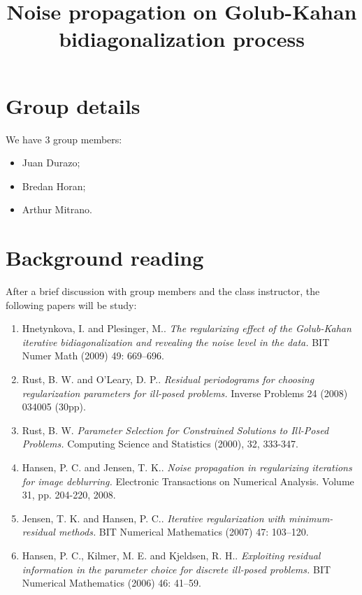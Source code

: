 \documentclass{article}
\begin{document}
\title{Noise propagation on Golub-Kahan bidiagonalization process}

\maketitle

\section{Group details}
We have 3 group members:
\begin{itemize}
	\item Juan Durazo;
	\item Bredan Horan;
	\item Arthur Mitrano.
\end{itemize}

\section{Background reading}
After a brief discussion with group members and the class instructor, the following papers will be study:

\begin{enumerate}
	\item Hnetynkova, I. and Plesinger, M..
		\emph{The regularizing effect of the Golub-Kahan iterative bidiagonalization and revealing the noise level in the data.}
		BIT Numer Math (2009) 49: 669–696.
	\item Rust, B. W. and O'Leary, D. P.. 
		\emph{Residual periodograms for choosing regularization parameters for ill-posed problems.}
		Inverse Problems 24 (2008) 034005 (30pp).
	\item Rust, B. W. 
		\emph{Parameter Selection for Constrained Solutions to Ill-Posed Problems.}
		Computing Science and Statistics (2000), 32, 333-347.
	\item  Hansen, P. C. and Jensen, T. K..
		\emph{Noise propagation in regularizing iterations for image deblurring.}
		Electronic Transactions on Numerical Analysis. Volume 31, pp. 204-220, 2008.
	\item Jensen, T. K. and Hansen, P. C..
		\emph{Iterative regularization with minimum-residual methods.}
		BIT Numerical Mathematics (2007) 47: 103–120.
	\item Hansen, P. C., Kilmer, M. E. and Kjeldsen, R. H..
		\emph{Exploiting residual information in the parameter choice for discrete ill-posed problems.}
		BIT Numerical Mathematics (2006) 46: 41–59.
\end{enumerate}
\end{document}
